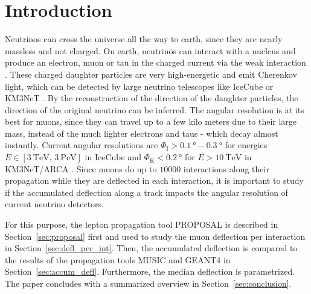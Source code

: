 \section{Introduction}\label{sec:introduction}
Neutrinos can cross the universe all the way to earth, since they are 
nearly massless and not charged. On earth, neutrinos can interact 
with a nucleus and produce an electron, muon or tau in the charged current 
via the weak interaction \cite{pdg}. These charged daughter particles are very 
high-energetic and emit Cherenkov light, which can be detected 
by large neutrino telescopes like IceCube \cite{IceCube_Instrumentation} or 
KM3NeT \cite{KM3NeT_Design}. 
By the reconstruction of the direction of the daughter particles, the direction 
of the original neutrino can be inferred. The angular resolution is at its 
best for muons, since they can travel up to a few kilo meters due to their 
large mass, instead of the much lighter electrons and taus - which decay almost 
instantly. Current angular resolutions are 
$\Phi_{\text{I}} > \SI{0.1}{\degree} - \SI{0.3}{\degree}$ for energies 
$E \in [\SI{3}{\tera\electronvolt},\,\SI{3}{\peta\electronvolt}]$ in IceCube 
\cite{IceCube_Resolution2021} 
and 
$\Phi_{\text{K}} < \SI{0.2}{\degree}$ for $E > \SI{10}{\tera\electronvolt}$ in 
KM3NeT/ARCA \cite{KM3NeT_Resolution2021}.
Since muons do up to $\num{10000}$ interactions along their propagation while they 
are deflected in each interaction, it is important to study if the accumulated 
deflection along a track impacts the angular resolution of current 
neutrino detectors. 

For this purpose, the lepton propagation 
tool PROPOSAL \cite{koehne2013proposal, dunsch_2018_proposal_improvements} is described in Section~\ref{sec:proposal} first and used to study the muon deflection per interaction in 
Section~\ref{sec:defl_per_int}. Then, the
accumulated deflection is compared to the results of the propagation tools MUSIC and GEANT4 in Section~\ref{sec:accum_defl}. Furthermore, the median deflection is parametrized. The 
paper concludes with a summarized overview in Section~\ref{sec:conclusion}.




